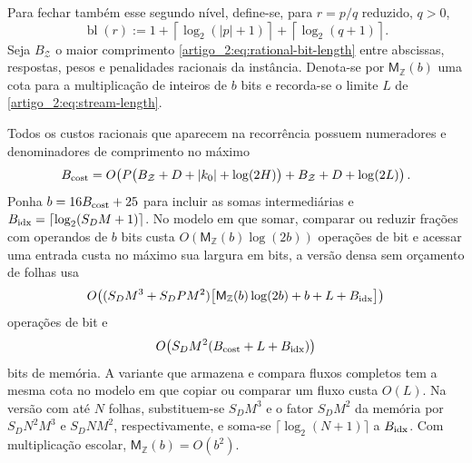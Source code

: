 Para fechar também esse segundo nível, define-se, para $r=p/q$ reduzido, $q>0$,
\begin{equation}
 \operatorname{bl}(r)
 :=1+\left\lceil\log_2(|p|+1)\right\rceil
    +\left\lceil\log_2(q+1)\right\rceil .
 \label{artigo_2:eq:rational-bit-length}
\end{equation}
Seja $B_{\mathcal Z}$ o maior comprimento \eqref{artigo_2:eq:rational-bit-length}
entre abscissas, respostas, pesos e penalidades racionais da instância. Denota-se
por $\mathsf M_{\mathbb Z}(b)$ uma cota para a multiplicação de inteiros de $b$ bits
e recorda-se o limite $L$ de \eqref{artigo_2:eq:stream-length}.

\begin{theorem}\label{map:artigo_2:9.3}
\label{artigo_2:thm:bit-complexity}
Todos os custos racionais que aparecem na recorrência possuem numeradores e
denominadores de comprimento no máximo
\begin{equation}
 B_{\rm cost}
 =O\!\left(
 P\bigl(B_{\mathcal Z}+D+|k_0|+\log(2H)\bigr)
 +B_{\mathcal Z}+D+\log(2L)
 \right).
 \label{artigo_2:eq:cost-bit-growth}
\end{equation}
Ponha $b=16B_{\rm cost}+25$ para incluir as somas intermediárias e
$B_{\rm idx}=\lceil\log_2(S_DM+1)\rceil$. No modelo em que
somar, comparar ou reduzir frações com operandos de $b$ bits custa
$O(\mathsf M_{\mathbb Z}(b)\log(2b))$ operações de bit e acessar uma entrada
custa no máximo sua largura em bits, a versão densa sem orçamento de folhas usa
\begin{equation}
 O\!\left(
 (S_DM^3+S_DPM^2)
 \bigl[\mathsf M_{\mathbb Z}(b)
       \log(2b)+b+L+B_{\rm idx}\bigr]
 \right)
 \label{artigo_2:eq:dense-bit-time}
\end{equation}
operações de bit e
\begin{equation}
 O\!\left(S_DM^2(B_{\rm cost}+L+B_{\rm idx})\right)
 \label{artigo_2:eq:dense-bit-memory}
\end{equation}
bits de memória. A variante que armazena e compara fluxos completos tem
a mesma cota no modelo em que copiar ou comparar um fluxo custa $O(L)$.
Na versão com até $N$ folhas, substituem-se $S_DM^3$ e o fator $S_DM^2$
da memória por $S_DN^2M^3$ e $S_DNM^2$, respectivamente, e soma-se
$\lceil\log_2(N+1)\rceil$ a $B_{\rm idx}$. Com multiplicação escolar,
$\mathsf M_{\mathbb Z}(b)=O(b^2)$.
\end{theorem}

